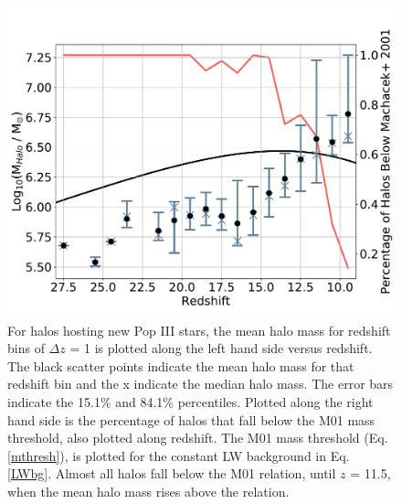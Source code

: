 \documentclass[a4paper,fleqn,usenatbib]{mnras}
\begin{document}
\begin{figure}
	\includegraphics[width=\columnwidth]{images/mean_mass_errorb_fix.pdf}
    \caption{For halos hosting new Pop III stars, the mean halo mass for redshift bins of $\Delta z$ = 1 is plotted along the left hand side versus redshift. The black scatter points indicate the mean halo mass for that redshift bin and the x indicate the median halo mass. The error bars indicate the 15.1\% and 84.1\% percentiles. Plotted along the right hand side is the percentage of halos that fall below the M01 mass threshold, also plotted along redshift. The M01 mass threshold (Eq. \ref{mthresh}), is plotted for the constant LW background in Eq. \ref{LWbg}. Almost all halos fall below the M01 relation, until $z$ = 11.5, when the mean halo mass rises above the relation.}
    \label{fig:mean_mass}
\end{figure}
\end{document}
